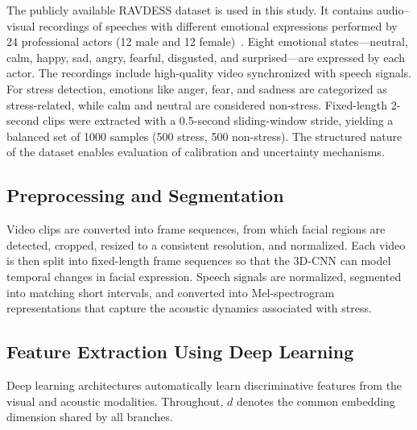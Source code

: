 \documentclass[conference]{IEEEtran}
\begin{document}
The publicly available RAVDESS dataset is used in this study. It contains audio–visual recordings of speeches with different emotional expressions performed by 24 professional actors (12 male and 12 female)~\cite{ref5}. Eight emotional states—neutral, calm, happy, sad, angry, fearful, disgusted, and surprised—are expressed by each actor. The recordings include high-quality video synchronized with speech signals. For stress detection, emotions like anger, fear, and sadness are categorized as stress-related, while calm and neutral are considered non-stress. Fixed-length 2-second clips were extracted with a 0.5-second sliding-window stride, yielding a balanced set of 1000 samples (500 stress, 500 non-stress). The structured nature of the dataset enables evaluation of calibration and uncertainty mechanisms.

\subsection{Preprocessing and Segmentation}

Video clips are converted into frame sequences, from which facial regions are detected, cropped, resized to a consistent resolution, and normalized. Each video is then split into fixed-length frame sequences so that the 3D-CNN can model temporal changes in facial expression. Speech signals are normalized, segmented into matching short intervals, and converted into Mel-spectrogram representations that capture the acoustic dynamics associated with stress.

\subsection{Feature Extraction Using Deep Learning}

Deep learning architectures automatically learn discriminative features from the visual and acoustic modalities. Throughout, $d$ denotes the common embedding dimension shared by all branches.
\end{document}
